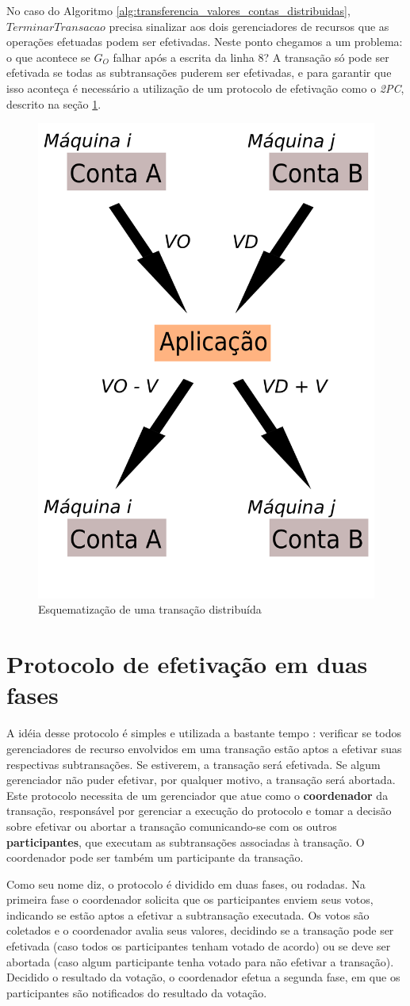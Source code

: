 \documentclass[11pt,twoside,a4paper]{book}
\begin{document}
No caso do Algoritmo \ref{alg:transferencia_valores_contas_distribuidas}, $TerminarTransacao$ precisa sinalizar aos dois gerenciadores de recursos que as operações efetuadas podem ser efetivadas. Neste ponto chegamos a um problema: o que acontece se $G_O$ falhar após a escrita da linha 8? A transação só pode ser efetivada se todas as subtransações puderem ser efetivadas, e para garantir que isso aconteça é necessário a utilização de um protocolo de efetivação como o \emph{2PC}, descrito na seção \ref{sec:2pc}.

\begin{figure}
  \centering
  \includegraphics[width=.40\textwidth]{transacao_distribuida} 
  \caption{Esquematização de uma transação distribuída}
  \label{fig:transacao_distribuida} 
\end{figure}

\section{Protocolo de efetivação em duas fases}
\label{sec:2pc}
A idéia desse protocolo é simples e utilizada a bastante tempo \cite{2pc}: verificar se todos gerenciadores de recurso envolvidos em uma transação estão aptos a efetivar suas respectivas subtransações. Se estiverem, a transação será efetivada. Se algum gerenciador não puder efetivar, por qualquer motivo, a transação será abortada. Este protocolo necessita de um gerenciador que atue como o \textbf{coordenador} da transação, responsável por gerenciar a execução do protocolo e tomar a decisão sobre efetivar ou abortar a transação comunicando-se com os outros \textbf{participantes}, que executam as subtransações associadas à transação. O coordenador pode ser também um participante da transação.

Como seu nome diz, o protocolo é dividido em duas fases, ou rodadas. Na primeira fase o coordenador solicita que os participantes enviem seus votos, indicando se estão aptos a efetivar a subtransação executada. Os votos são coletados e o coordenador avalia seus valores, decidindo se a transação pode ser efetivada (caso todos os participantes tenham votado de acordo) ou se deve ser abortada (caso algum participante tenha votado para não efetivar a transação). Decidido o resultado da votação, o coordenador efetua a segunda fase, em que os participantes são notificados do resultado da votação. 
\end{document}
